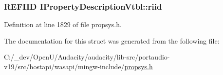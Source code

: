 \subsubsection[{\texorpdfstring{riid}{riid}}]{ {\bf R\+E\+F\+I\+ID} I\+Property\+Description\+Vtbl\+::riid}\hypertarget{struct_i_property_description_vtbl_aad9302e0e2cf83efc740f2d95f563ffa}{}\label{struct_i_property_description_vtbl_aad9302e0e2cf83efc740f2d95f563ffa}


Definition at line 1829 of file propsys.\+h.



The documentation for this struct was generated from the following file\+:\begin{DoxyCompactItemize}
\item 
C\+:/\+\_\+dev/\+Open\+U/\+Audacity/audacity/lib-\/src/portaudio-\/v19/src/hostapi/wasapi/mingw-\/include/\hyperlink{propsys_8h}{propsys.\+h}\end{DoxyCompactItemize}
